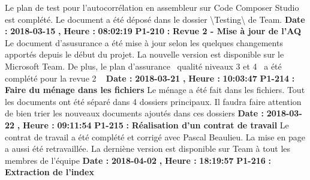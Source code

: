 \documentclass{article}%
\begin{document}
\newline%
\newline%
%
Le plan de test pour l'autocorrélation en assembleur sur Code Composer Studio est complété. Le document a été déposé dans le dossier \textbackslash{}Testing\textbackslash{} de Team.\newline%
\newline%
%
\textbf{Date : }%
\textbf{2018{-}03{-}15}%
\textbf{,}%
\textbf{ Heure : }%
\textbf{08:02:19}%
\newline%
%
\textbf{P1{-}210 }%
\textbf{ : }%
\textbf{ Revue 2 {-} Mise à jour de l'AQ}%
\newline%
\newline%
%
Le document d'asusurance a été mise à jour selon les quelques changements apportés depuis le début du projet. La nouvelle version est disponible sur le Microsoft Team. De plus, le plan d'assurance~ qualité niveaux 3 et 4~ a été complété pour la revue 2\newline%
~\newline%
\newline%
%
\textbf{Date : }%
\textbf{2018{-}03{-}21}%
\textbf{,}%
\textbf{ Heure : }%
\textbf{10:03:47}%
\newline%
%
\textbf{P1{-}214 }%
\textbf{ : }%
\textbf{ Faire du ménage dans les fichiers}%
\newline%
\newline%
%
Le ménage a été fait dans les fichiers. Tout les documents ont été séparé dans 4 dossiers principaux. Il faudra faire attention de bien trier les nouveaux documents ajoutés dans ces dossiers\newline%
\newline%
%
\textbf{Date : }%
\textbf{2018{-}03{-}22}%
\textbf{,}%
\textbf{ Heure : }%
\textbf{09:11:54}%
\newline%
%
\textbf{P1{-}215 }%
\textbf{ : }%
\textbf{ Réalisation d'un contrat de travail}%
\newline%
\newline%
%
Le contrat de travail a été complété et corrigé avec Pascal Beaulieu. La mise en page a aussi été retravaillée. La derniène version est disponible sur Team à tout les membres de l'équipe\newline%
\newline%
%
\textbf{Date : }%
\textbf{2018{-}04{-}02}%
\textbf{,}%
\textbf{ Heure : }%
\textbf{18:19:57}%
\newline%
%
\textbf{P1{-}216 }%
\textbf{ : }%
\textbf{ Extraction de l'index}%
\newline%
\end{document}
